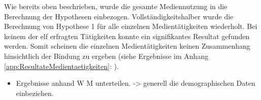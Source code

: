 Wie bereits oben beschrieben, wurde die gesamte Mediennutzung in die Berechnung der Hypothesen einbezogen. Vollständigkeitshalber wurde die Berechnung von Hypothese 1 für alle einzelnen Medientätigkeiten wiederholt. Bei keinem der elf erfragten Tätigkeiten konnte ein signifikantes Resultat gefunden werden. Somit scheinen die einzelnen Medientätigkeiten keinen Zusammenhang hinsichtlich der Bindung zu ergeben (siehe Ergebnisse im Anhang \ref{app:ResultateMedientaetigkeiten}: \textit{}).

\begin{itemize}
    \item Ergebnisse anhand W M unterteilen. -> generell die demographischen Daten einbeziehen.
\end{itemize}





